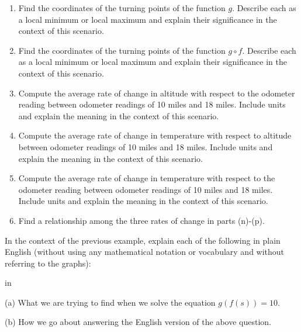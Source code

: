 \documentclass{ximera}
\newcommand{\pskip}{\vskip 0.1 in}
\begin{document}
\begin{example}
\begin{enumerate}
\item Find the coordinates of the turning points of the function $g$. Describe each as a local minimum or local maximum and explain their significance in the context of this scenario.

\item Find the coordinates of the turning points of the function $g\circ f$. Describe each as a local minimum or local maximum and explain their significance in the context of this scenario.

\item Compute the average rate of change in altitude with respect to the odometer reading between odometer readings of 10 miles and 18 miles. Include units and explain the meaning in the context of this scenario.

\item Compute the average rate of change in temperature with respect to altitude between odometer readings of 10 miles and 18 miles. Include units and explain the meaning in the context of this scenario.

\item Compute the average rate of change in temperature with respect to the odometer reading between odometer readings of 10 miles and 18 miles. Include units and explain the meaning in the context of this scenario.

\item Find a relationship among the three rates of change in parts (n)-(p).

\end{enumerate}


\begin{exploration}\label{Exp3:Comp}

 
\begin{onlineOnly}
    \begin{center}
\end{center}
\end{onlineOnly}
\end{exploration}

\end{example}



\begin{example} \label{Ex4:Comp}
In the context of the previous example, explain each of the following in plain English (without using any mathematical notation or vocabulary and without referring to the graphs):

\pskip

(a) What we are trying to find when we solve the equation $g(f(s)) = 10$.

(b) How we go about answering the English version of the above question.

\end{example}
\end{document}
